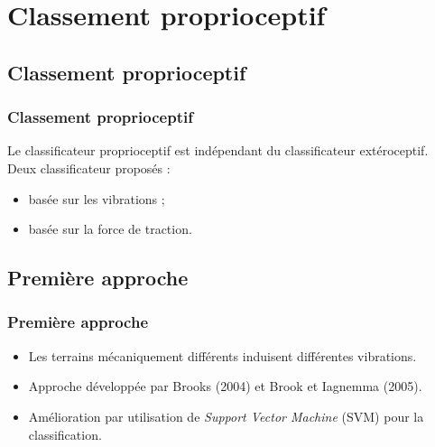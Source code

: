 \section{Classement proprioceptif}

\subsection{Classement proprioceptif}    
    \begin{frame}
        \frametitle{Classement proprioceptif}
        Le classificateur proprioceptif est indépendant du classificateur
        extéroceptif. \\ \vspace{5mm}
        Deux classificateur proposés :
        \begin{itemize}
            \item basée sur les vibrations ;
            \item basée sur la force de traction.
        \end{itemize}
          
    \end{frame}
    
\subsection{Première approche}    
    \begin{frame}
        \frametitle{Première approche}
        \begin{itemize}
            \item Les terrains mécaniquement différents induisent différentes vibrations.
            \item Approche développée par Brooks (2004) et Brook et Iagnemma (2005).
            \item Amélioration par utilisation de \textit{Support Vector Machine} (SVM) pour la classification.
        \end{itemize}          
    \end{frame}
    
